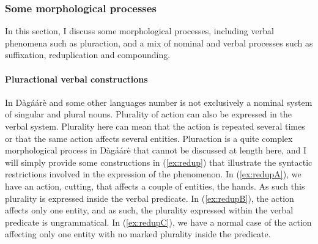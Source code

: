 \subsubsection{Some morphological processes}
In this section, I discuss some morphological processes, including verbal phenomena
such as pluraction, and a mix of nominal and verbal processes such as suffixation,
reduplication and compounding.

\paragraph{Pluractional verbal constructions}
In Dàgáárè and some other languages number is not exclusively a nominal system of
singular and plural nouns. Plurality of action can also be expressed in the verbal system.
Plurality here can mean that the action is repeated several times or that the same action affects
several entities. Pluraction is a quite complex morphological process in Dàgáárè that cannot
be discussed at length here, and I will simply provide some constructions in (\ref{ex:redup}) that illustrate
the syntactic restrictions involved in the expression of the phenomenon.
In (\ref{ex:redupA}), we have an action, cutting, that affects a couple of entities, the hands. As
such this plurality is expressed inside the verbal predicate. In (\ref{ex:redupB}), the action affects only
one entity, and as such, the plurality expressed within the verbal predicate is ungrammatical.
In (\ref{ex:redupC}), we have a normal case of the action affecting only one entity with no marked
plurality inside the predicate.

\ea \label{ex:redup} 
\z\z



